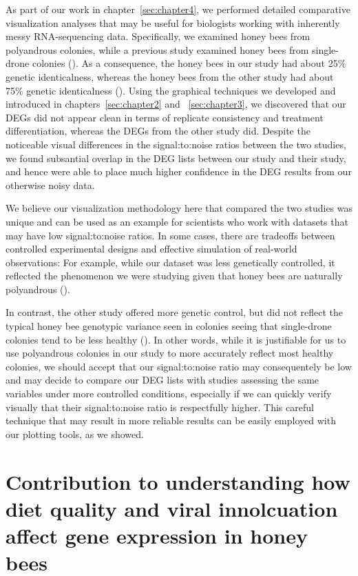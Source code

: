 \documentclass[11pt,a4paper,oldfontcommands,openany]{memoir}
\numberwithin{equation}{section} %
\begin{document}
As part of our work in chapter~\ref{sec:chapter4}, we performed detailed comparative visualization analyses that may be useful for biologists working with inherently messy RNA-sequencing data. Specifically, we examined honey bees from polyandrous colonies, while a previous study examined honey bees from single-drone colonies (\citealt{galbraith}). As a consequence, the honey bees in our study had about 25\% genetic identicalness, whereas the honey bees from the other study had about 75\% genetic identicalness (\citealt{sisters}). Using the graphical techniques we developed and introduced in chapters~\ref{sec:chapter2} and ~\ref{sec:chapter3}, we discovered that our DEGs did not appear clean in terms of replicate consistency and treatment differentiation, whereas the DEGs from the other study did. Despite the noticeable visual differences in the signal:to:noise ratios between the two studies, we found subsantial overlap in the DEG lists between our study and their study, and hence were able to place much higher confidence in the DEG results from our otherwise noisy data.

We believe our visualization methodology here that compared the two studies was unique and can be used as an example for scientists who work with datasets that may have low signal:to:noise ratios. In some cases, there are tradeoffs between controlled experimental designs and effective simulation of real-world observations: For example, while our dataset was less genetically controlled, it reflected the phenomenon we were studying given that honey bees are naturally polyandrous (\citealt{patriline}). 

In contrast, the other study offered more genetic control, but did not reflect the typical honey bee genotypic variance seen in colonies seeing that single-drone colonies tend to be less healthy (\citealt{geneticDiverse}). In other words, while it is justifiable for us to use polyandrous colonies in our study to more accurately reflect most healthy colonies, we should accept that our signal:to:noise ratio may consequentely be low and may decide to compare our DEG lists with studies assessing the same variables under more controlled conditions, especially if we can quickly verify visually that their signal:to:noise ratio is respectfully higher. This careful technique that may result in more reliable results can be easily employed with our plotting tools, as we showed.

\section{Contribution to understanding how diet quality and viral innolcuation affect gene expression in honey bees}
\end{document}
